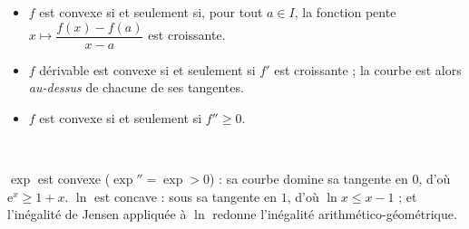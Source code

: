\noindent
\begin{minipage}[c]{0.52\linewidth}
\begin{theoreme}[Caractérisations]
\begin{itemize}[label={\color{otNavy}\textbullet},leftmargin=1.4em,itemsep=0.6mm,topsep=0.8mm]
  \item {} $f$ est convexe si et seulement si, pour tout
    $a\in I$, la fonction pente $x\mapsto\dfrac{f(x)-f(a)}{x-a}$ est
    croissante.
  \item {} $f$ dérivable est convexe si et seulement si $f'$
    est croissante ; la courbe est alors \emph{au-dessus} de chacune de ses
    tangentes.
  \item {} $f$ est convexe si et seulement si
    $f''\geq0$.
\end{itemize}
\end{theoreme}
\end{minipage}\hfill
\begin{minipage}[c]{0.44\linewidth}
\centering
{}\\[0.5mm]
\end{minipage}

\begin{exemple}
$\exp$ est convexe ($\exp''=\exp>0$) : sa courbe domine sa tangente en $0$,
d'où $\mathrm{e}^{x}\geq1+x$. $\ln$ est concave : sous sa tangente en $1$,
d'où $\ln x\leq x-1$ ; et l'inégalité de Jensen appliquée à $\ln$ redonne
l'inégalité arithmético-géométrique.
\end{exemple}


